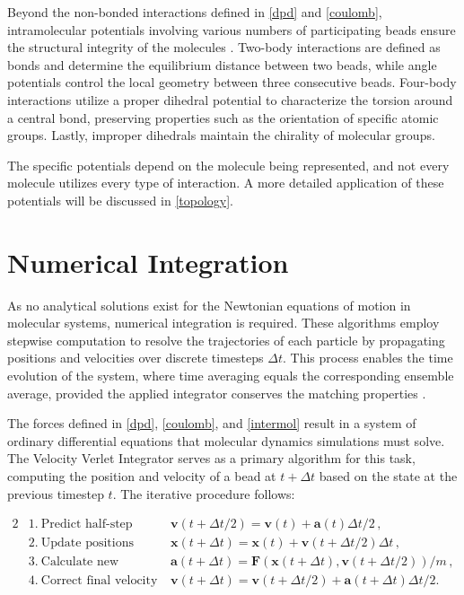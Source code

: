 \documentclass[
    11pt,
    a4paper,
    oneside,        %
    BCOR=10mm,      %
    parskip=half,   %
    listof=nototoc,   %
    bibliography=totoc %
]{scrreprt}
\begin{document}
Beyond the non-bonded interactions defined in \cref{dpd} and \cref{coulomb}, intramolecular potentials involving various numbers of participating beads ensure the structural integrity of the molecules \cite{Martini}. Two-body interactions are defined as bonds and determine the equilibrium distance between two beads, while angle potentials control the local geometry between three consecutive beads. Four-body interactions utilize a proper dihedral potential to characterize the torsion around a central bond, preserving properties such as the orientation of specific atomic groups. Lastly, improper dihedrals maintain the chirality of molecular groups.

The specific potentials depend on the molecule being represented, and not every molecule utilizes every type of interaction. A more detailed application of these potentials will be discussed in \cref{topology}.

\section{Numerical Integration}

As no analytical solutions exist for the Newtonian equations of motion in molecular systems, numerical integration is required. These algorithms employ stepwise computation to resolve the trajectories of each particle by propagating positions and velocities over discrete timesteps $\Delta t$. This process enables the time evolution of the system, where time averaging equals the corresponding ensemble average, provided the applied integrator conserves the matching properties \cite{Allen2017_verlet}.

The forces defined in \cref{dpd}, \cref{coulomb}, and \cref{intermol} result in a system of ordinary differential equations that molecular dynamics simulations must solve. The Velocity Verlet Integrator \cite{Allen2017_verlet} serves as a primary algorithm for this task, computing the position and velocity of a bead at $t+\Delta t$ based on the state at the previous timestep $t$. The iterative procedure follows:

\begin{alignat}{2}
&1.\ \text{Predict half-step velocity} \quad &&\mathbf{v}(t + \Delta t/2) = \mathbf{v}(t) +
\mathbf{a}(t) \Delta t/2\, ,\\
&2.\ \text{Update positions} \quad&&\mathbf{x}(t + \Delta t) = \mathbf{x}(t) +
\mathbf{v}(t + \Delta t/2)\Delta t\, ,\\
&3.\ \text{Calculate new acceleration} \quad&&\mathbf{a}(t + \Delta t) =
\mathbf{F}(\mathbf{x}(t + \Delta t), \mathbf{v}(t + \Delta t/2))/m\, ,\\
&4.\ \text{Correct final velocity} \quad&&\mathbf{v}(t + \Delta t) =
\mathbf{v}(t + \Delta t/2) + \mathbf{a}(t + \Delta t)\Delta t/2.
\end{alignat}
\end{document}

